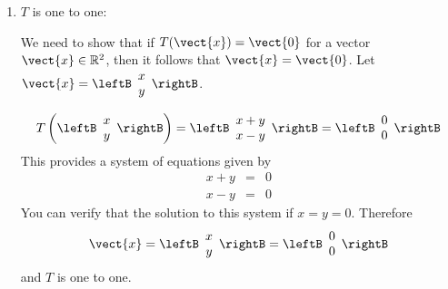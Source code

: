 \begin{solution}
\begin{enumerate}
\begin{eqnarray*}
\begin{array}{c}
px_2 + py_2 \\
px_2 - py_2
\end{array} \rightB \\
&=& k \leftB \begin{array}{c}
x_1 + y_1  \\
x_1  - y_1
\end{array} \rightB + 
p \leftB \begin{array}{c}
x_2 + y_2 \\
x_2 - y_2
\end{array} \rightB \\
&=& 
k T \left(  \leftB \begin{array}{c}
x_1 \\
y_1
\end{array} \rightB \right) + p T \left( \leftB \begin{array}{c}
x_2 \\
y_2
\end{array} \rightB \right)
\end{eqnarray*}

Therefore $T$ is linear. 

\item $T$ is one to one:

We need to show that if $T (\vect{x}) = \vect{0}$ for a vector $\vect{x} \in \mathbb{R}^2$, then it follows that $\vect{x} = \vect{0}$.  Let $\vect{x} = \leftB \begin{array}{c}
x \\
y
\end{array} \rightB$. 

\[
T  \left( \leftB \begin{array}{c}
x \\
y
\end{array} \rightB \right) = \leftB \begin{array}{c}
x + y\\
x - y 
\end{array} \rightB = \leftB \begin{array}{c}
0 \\
0
\end{array} \rightB
\]
This provides a system of equations given by 
\begin{eqnarray*}
x + y &=& 0\\
x - y &=& 0
\end{eqnarray*}
You can verify that the solution to this system if $x = y =0$. Therefore 
\[
\vect{x} = \leftB \begin{array}{c}
x \\
y
\end{array} \rightB
 = \leftB \begin{array}{c}
0 \\
0
\end{array} \rightB
\]
and $T$ is one to one.


\end{enumerate}
\end{solution}
